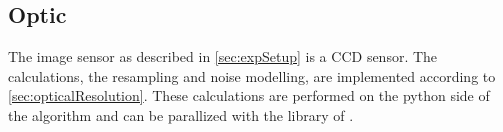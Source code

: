 \subsection{Optic}
\label{sec:ccdOptic}
%
The image sensor as described in \cref{sec:expSetup} is a \ac{CCD} sensor.
The calculations, \ie the resampling and noise modelling, are implemented according to \cref{sec:opticalResolution}.
These calculations are performed on the python side of the algorithm and can be parallized with the  library of \python{}.
%
%
%
%
%
%
%
